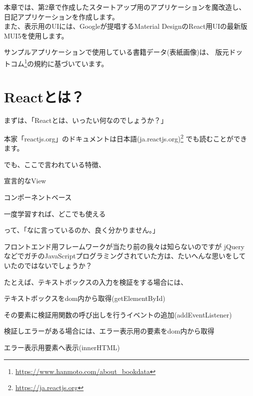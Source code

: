 \begin{starterabstract}
  本章では、第2章で作成したスタートアップ用のアプリケーションを魔改造し、日記アプリケーションを作成します。\\[0pt]

  また、表示用のUIには、Googleが提唱するMaterial DesignのReact用UIの最新版MUI5を使用します。
\end{starterabstract}

サンプルアプリケーションで使用している書籍データ(表紙画像)は、
版元ドットコム\footnote{\url{https://www.hanmoto.com/about_bookdata}}の規約に基づいています。


\clearpage


\section{Reactとは？}
\keeplastskip{
  \label{sec:3-1}
  \label{sec-031React}
  \par\nobreak
}

まずは、「Reactとは、いったい何なのでしょうか？」

\vspace*{\baselineskip}

本家「reactjs.org」のドキュメントは日本語(ja.reactjs.org)\footnote{\url{https://ja.reactjs.org}}
でも読むことができます。

でも、ここで言われている特徴、

\begin{starteritemize}
\item 宣言的なView
\item コンポーネントベース
\item 一度学習すれば、どこでも使える
\end{starteritemize}

って、「なに言っているのか、良く分かりません。」

\vspace*{\baselineskip}

フロントエンド用フレームワークが当たり前の我々は知らないのですが
jQueryなどでガチのJavaScriptプログラミングされていた方は、たいへんな思いをしていたのではないでしょうか？

\vspace*{\baselineskip}

たとえば、テキストボックスの入力を検証をする場合には、

\begin{starterenumerate}
\item テキストボックスをdom内から取得(getElementById)
\item その要素に検証用関数の呼び出しを行うイベントの追加(addEventListener)
\item 検証しエラーがある場合には、エラー表示用の要素をdom内から取得
\item エラー表示用要素へ表示(innerHTML)
\end{starterenumerate}

